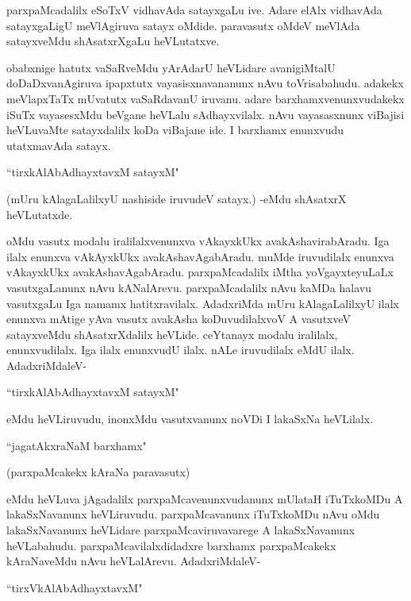 parxpaMcadalilx eSoTxV vidhavAda satayxgaLu ive. Adare elAlx vidhavAda satayxgaLigU meVlAgiruva satayx oMdide. paravasutx oMdeV meVlAda satayxveMdu shAsatxrXgaLu heVLutatxve.

obabxnige hatutx vaSaRveMdu yArAdarU heVLidare avanigiMtalU doDaDxvanAgiruva ipapxtutx vayasisxnavananunx nAvu toVrisabahudu. adakekx meVlapxTaTx mUvatutx vaSaRdavanU iruvanu. adare barxhamxvenunxvudakekx iSuTx vayasesxMdu beVgane heVLalu sAdhayxvilalx. nAvu vayasasxnunx viBajisi heVLuvaMte satayxdalilx koDa viBajane ide. I barxhamx enunxvudu utatxmavAda satayx. 

 \begin{shloka}
 ``tirxkAlAbAdhayxtavxM satayxM"
 \end{shloka}

(mUru kAlagaLalilxyU nashiside iruvudeV satayx.) -eMdu shAsatxrX heVLutatxde. 


oMdu vasutx modalu iralilalxvenunxva vAkayxkUkx avakAshavirabAradu. Iga ilalx enunxva vAkAyxkUkx avakAshavAgabAradu. muMde iruvudilalx enunxva vAkayxkUkx avakAshavAgabAradu. parxpaMcadalilx iMtha yoVgayxteyuLaLx vasutxgaLanunx nAvu kANalArevu. parxpaMcadalilx nAvu kaMDa halavu vasutxgaLu Iga namamx hatitxravilalx. AdadxriMda mUru kAlagaLalilxyU ilalx enunxva mAtige yAva vasutx avakAsha koDuvudilalxvoV A vasutxveV satayxveMdu shAsatxrXdalilx heVLide. ceYtanayx modalu iralilalx, enunxvudilalx. Iga ilalx enunxvudU ilalx. nALe iruvudilalx eMdU ilalx. AdadxriMdaleV-

\begin{shloka}
``tirxkAlAbAdhayxtavxM satayxM"
\end{shloka}

eMdu heVLiruvudu, inonxMdu vasutxvanunx noVDi I lakaSxNa heVLilalx.

\begin{shloka}
``jagatAkxraNaM barxhamx"
\end{shloka}

(parxpaMcakekx kAraNa paravasutx)

eMdu heVLuva jAgadalilx parxpaMcavenunxvudanunx mUlataH iTuTxkoMDu A lakaSxNavanunx heVLiruvudu. parxpaMcavanunx iTuTxkoMDu nAvu oMdu lakaSxNavanunx heVLidare parxpaMcaviruvavarege A lakaSxNavanunx heVLabahudu. parxpaMcavilalxdidadxre barxhamx parxpaMcakekx kAraNaveMdu nAvu heVLalArevu. AdadxriMdaleV-


\begin{shloka}
``tirxVkAlAbAdhayxtavxM"
\end{shloka}

